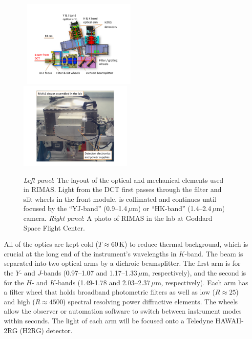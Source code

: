 \documentclass[letterpaper,11pt]{article}
\begin{document}
\begin{figure}[tp!]
\begin{center}
\hbox{
\includegraphics[width=0.5\textwidth]{figures/slide3.pdf}
\includegraphics[width=0.5\textwidth]{figures/slide4.pdf}
}
\vspace{-1.1cm}
\end{center}
\caption{\footnotesize
{{\it Left panel}: The layout of the optical and mechanical elements used in RIMAS.
Light from the DCT first passes through the filter and slit wheels in the 
front module, is collimated and continues until focused by the ``YJ-band'' 
(0.9--1.4\,$\mu$m) or ``HK-band'' (1.4--2.4\,$\mu$m) camera.
{\it Right panel}: A photo of RIMAS in the lab at Goddard Space Flight Center.}}
\label{fig2}
\end{figure}

All of the optics are kept cold ($T \approx 60$\,K) to reduce 
thermal background, which is crucial at the long end of the instrument’s 
wavelengths in $K$-band. The beam is separated into two optical arms by a
dichroic beamsplitter. The first arm is for the $Y$- and $J$-bands 
(0.97--1.07 and 1.17--1.33\,$\mu$m, respectively), and the second is for the $H$- 
and $K$-bands (1.49-1.78 and 2.03--2.37\,$\mu$m, respectively). Each 
arm has a filter wheel that holds broadband photometric filters as well as low ($R \approx
25$) and high ($R \approx 4500$) spectral resolving power diffractive elements. 
The wheels allow the observer or automation software to switch between instrument modes 
within seconds.  The light of each arm will be focused onto a Teledyne HAWAII-2RG (H2RG) detector.
\end{document}
